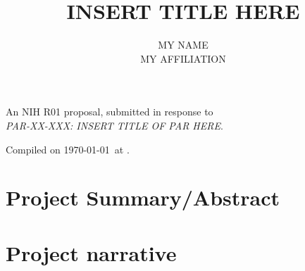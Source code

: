 \documentclass[12pt]{article}
\title{INSERT TITLE HERE}
\author{MY NAME\\
MY AFFILIATION}
\newcommand{\instructions}[1]{}
\begin{document}
\maketitle

\begin{center}
An NIH R01 proposal, submitted in response to \\
{\em PAR-XX-XXX: INSERT TITLE OF PAR HERE}.
\end{center}

\vfill

{\scriptsize Compiled on \today\ at \currenttime.}

\clearpage
\section*{Project Summary/Abstract}

\instructions{ The Project Summary must contain a summary of the
    proposed activity suitable for dissemination to the public. It
    should be a self-contained description of the project and should
    contain a statement of objectives and methods to be employed. It
    should be informative to other persons working in the same or
    related fields and insofar as possible understandable to a
    scientifically or technically literate lay reader.  The Project
    Summary is meant to serve as a succinct and accurate description
    of the proposed work when separated from the application. State
    the application's broad, long-term objectives and specific aims,
    making reference to the health relatedness of the project (i.e.,
    relevance to the mission of the agency). Describe concisely the
    research design and methods for achieving the stated goals. This
    section should be informative to other persons working in the same
    or related fields and insofar as possible understandable to a
    scientifically or technically literate reader. Avoid describing
    past accomplishments and the use of the first person. Finally,
    please make every effort to be succinct. This section must be no
    longer than 30 lines of text.}


\clearpage
\section*{Project narrative}

\instructions{ Using no more than two or three sentences, describe the
    relevance of this research to public health. In this section, be
    succinct and use plain language that can be understood by a
    general, lay audience.}
\end{document}
